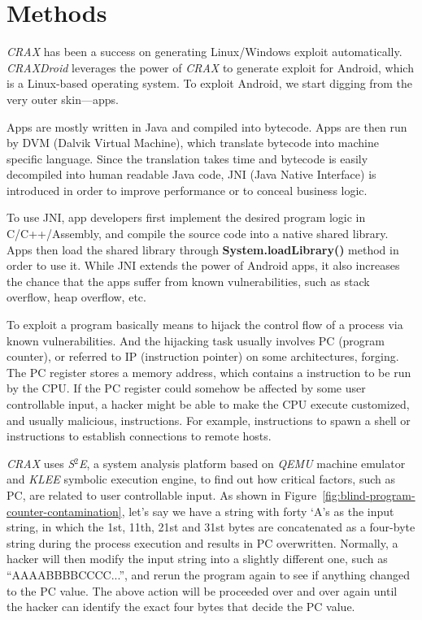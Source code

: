 \chapter{Methods}

\emph{CRAX}\autocite{huang2012crax} has been a success on generating
Linux/Windows exploit automatically. \emph{CRAXDroid} leverages the power of
\emph{CRAX} to generate exploit for Android, which is a Linux-based operating
system. To exploit Android, we start digging from the very outer skin---apps.

Apps are mostly written in Java and compiled into bytecode. Apps are then run
by DVM (Dalvik Virtual Machine), which translate bytecode into machine specific
language. Since the translation takes time and bytecode is easily decompiled
into human readable Java code, JNI (Java Native Interface) is introduced in
order to improve performance or to conceal business logic.

To use JNI, app developers first implement the desired program logic in
C/C++/Assembly, and compile the source code into a native shared library. Apps
then load the shared library through \textbf{System.loadLibrary()} method in
order to use it. While JNI extends the power of Android apps, it also increases
the chance that the apps suffer from known vulnerabilities, such as stack
overflow, heap overflow, etc.

To exploit a program basically means to hijack the control flow of a process
via known vulnerabilities. And the hijacking task usually involves PC (program
counter), or referred to IP (instruction pointer) on some architectures,
forging. The PC register stores a memory address, which contains a instruction
to be run by the CPU. If the PC register could somehow be affected by some user
controllable input, a hacker might be able to make the CPU execute customized,
and usually malicious, instructions. For example, instructions to spawn a
shell or instructions to establish connections to remote hosts.

\emph{CRAX} uses \emph{S$^{2}$E}\autocite{chipounov2011s2e}, a system analysis
platform based on \emph{QEMU} machine emulator and \emph{KLEE} symbolic
execution engine, to find out how critical factors, such as PC, are related to
user controllable input. As shown in
Figure~\ref{fig:blind-program-counter-contamination}, let's say we have a
string with forty `A's as the input string, in which the 1st, 11th, 21st and
31st bytes are concatenated as a four-byte string during the process execution
and results in PC overwritten. Normally, a hacker will then modify the input
string into a slightly different one, such as ``AAAABBBBCCCC...'', and rerun
the program again to see if anything changed to the PC value. The above action
will be proceeded over and over again until the hacker can identify the exact
four bytes that decide the PC value.


